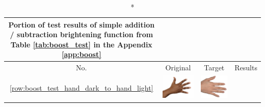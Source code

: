 \begin{longtable}{|c||c|c|c|}
    \caption*{Portion of test results of simple addition / subtraction brightening function from Table \ref{tab:boost_test} in the Appendix \ref{app:boost}}\\
    \hline
    No. & Original & Target & Results \\ 
      \hline  \ref{row:boost_test_hand_dark_to_hand_light} &
  \begin{minipage}{.29\textwidth}
    \includegraphics[width=\textwidth,height=\textheight,keepaspectratio]{../inputs/hand_dark.jpg}
  \end{minipage} & 
  \begin{minipage}{.29\textwidth}
    \includegraphics[width=\textwidth,height=\textheight,keepaspectratio]{../inputs/hand_light.jpg}

\end{minipage}
\end{longtable}

